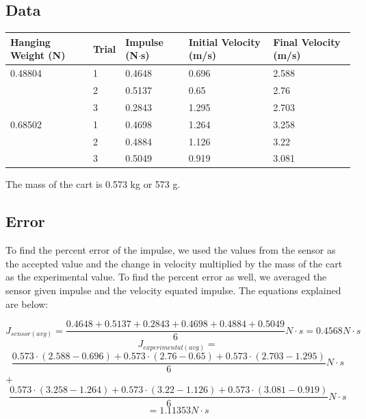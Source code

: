 \documentclass{report}
\begin{document}
\subsection*{Data}

\begin{table}[h!]
\begin{tabular}{|l|l|l|l|l|}
\hline
Hanging Weight (N) & Trial & Impulse (N$\cdot$s) & Initial Velocity (m/s) & Final Velocity (m/s) \\ \hline
0.48804            & 1     & 0.4648        & 0.696                  & 2.588                \\ \hline
                   & 2     & 0.5137        & 0.65                   & 2.76                 \\ \hline
                   & 3     & 0.2843        & 1.295                  & 2.703                \\ \hline
0.68502            & 1     & 0.4698        & 1.264                  & 3.258                \\ \hline
                   & 2     & 0.4884        & 1.126                  & 3.22                 \\ \hline
                   & 3     & 0.5049        & 0.919                  & 3.081                \\ \hline
\end{tabular}
\end{table}

The mass of the cart is 0.573 kg or 573 g.


\subsection*{Error}

To find the percent error of the impulse, we used the values from the sensor as the accepted value and the change in velocity multiplied by the mass of the cart as the experimental value. To find the percent error as well, we averaged the sensor given impulse and the velocity equated impulse. The equations explained are below: 

$$ J_{sensor(avg)} = \frac{0.4648 + 0.5137 + 0.2843 + 0.4698 + 0.4884 + 0.5049}{6} N\cdot s = 0.4568 N \cdot s$$
$$ J_{experimental(avg)} = $$
$$\frac{0.573 \cdot (2.588 - 0.696) + 0.573 \cdot (2.76 - 0.65) + 0.573 \cdot (2.703 - 1.295)}{6} N \cdot s$$ + $$\frac{0.573 \cdot (3.258 - 1.264) + 0.573 \cdot (3.22 - 1.126) + 0.573 \cdot (3.081 - 0.919)}{6} N \cdot s$$ $$ = 1.11353 N \cdot s$$
\end{document}
